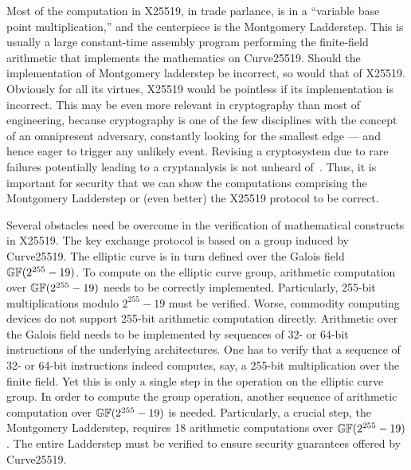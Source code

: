 Most of the computation in X25519, in trade parlance, is in a
``variable base point multiplication,'' and the centerpiece 
is the Montgomery Ladderstep. This is usually a
large constant-time assembly program performing the
finite-field arithmetic that implements the mathematics on Curve25519.
Should the implementation of Montgomery ladderstep be incorrect, so
would that of X25519. Obviously for all its virtues, X25519 would be
pointless if its implementation is incorrect. This may be even more
relevant in cryptography than most of engineering, because cryptography is
one of the few disciplines with the concept of an omnipresent
adversary, constantly looking for the smallest edge --- and hence
eager to trigger any unlikely event. Revising a cryptosystem
due to rare failures potentially leading to a cryptanalysis is not
unheard of~\cite{HNPPSSW:03:IDFSNE}.
Thus, it is important for security that we can show the computations
comprising the Montgomery Ladderstep or (even better) the X25519
protocol to be correct. 

Several obstacles need be overcome in the verification of mathematical
constructs in X25519. The key exchange protocol is based on a
group induced by Curve25519. The elliptic
curve is in turn defined over the Galois field $\mathbb{GF}(2^{255} - 19)$. 
To compute on the elliptic curve group, arithmetic computation over
$\mathbb{GF}(2^{255} - 19)$ needs to be correctly implemented. 
Particularly, 255-bit multiplications modulo
$2^{255} - 19$ must be verified. Worse, commodity computing devices do
not support 255-bit arithmetic computation directly. Arithmetic over
the Galois field needs to be implemented by sequences of 32- or 64-bit
instructions of the underlying architectures. One has to
verify that a sequence of 32- or 64-bit instructions indeed
computes, say, a 255-bit multiplication over the finite field. Yet this
is only a single step in the operation on the elliptic curve group.
In order to compute the group operation, another sequence of
arithmetic computation over $\mathbb{GF}(2^{255} - 19)$ is
needed. Particularly, a crucial step,
the Montgomery Ladderstep, requires 18 arithmetic 
computations over $\mathbb{GF}(2^{255} - 19)$. The entire Ladderstep must be
verified to ensure security guarantees offered by Curve25519.

